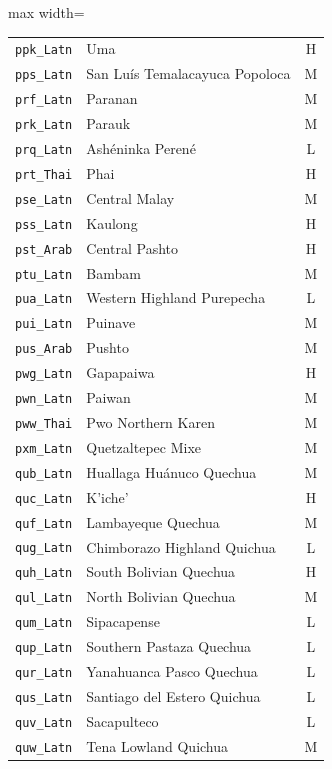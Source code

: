 {\begin{adjustbox}{max width=\textwidth}
\begin{tabular}{llc}
        \texttt{ppk\_Latn} & Uma & H \\
        \texttt{pps\_Latn} & San Luís Temalacayuca Popoloca & M \\
        \texttt{prf\_Latn} & Paranan & M \\
        \texttt{prk\_Latn} & Parauk & M \\
        \texttt{prq\_Latn} & Ashéninka Perené & L \\
        \texttt{prt\_Thai} & Phai & H \\
        \texttt{pse\_Latn} & Central Malay & M \\
        \texttt{pss\_Latn} & Kaulong & H \\
        \texttt{pst\_Arab} & Central Pashto & H \\
        \texttt{ptu\_Latn} & Bambam & M \\
        \texttt{pua\_Latn} & Western Highland Purepecha & L \\
        \texttt{pui\_Latn} & Puinave & M \\
        \texttt{pus\_Arab} & Pushto & M \\
        \texttt{pwg\_Latn} & Gapapaiwa & H \\
        \texttt{pwn\_Latn} & Paiwan & M \\
        \texttt{pww\_Thai} & Pwo Northern Karen & M \\
        \texttt{pxm\_Latn} & Quetzaltepec Mixe & M \\
        \texttt{qub\_Latn} & Huallaga Huánuco Quechua & M \\
        \texttt{quc\_Latn} & K'iche' & H \\
        \texttt{quf\_Latn} & Lambayeque Quechua & M \\
        \texttt{qug\_Latn} & Chimborazo Highland Quichua & L \\
        \texttt{quh\_Latn} & South Bolivian Quechua & H \\
        \texttt{qul\_Latn} & North Bolivian Quechua & M \\
        \texttt{qum\_Latn} & Sipacapense & L \\
        \texttt{qup\_Latn} & Southern Pastaza Quechua & L \\
        \texttt{qur\_Latn} & Yanahuanca Pasco Quechua & L \\
        \texttt{qus\_Latn} & Santiago del Estero Quichua & L \\
        \texttt{quv\_Latn} & Sacapulteco & L \\
        \texttt{quw\_Latn} & Tena Lowland Quichua & M \\

\end{tabular}
\end{adjustbox}}
